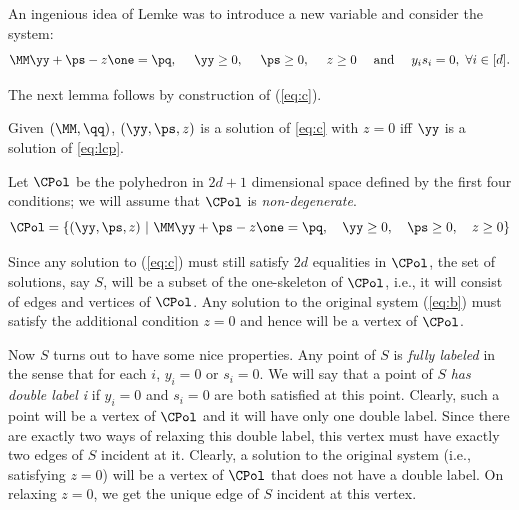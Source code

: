 An ingenious idea of Lemke was to introduce a new variable and consider the system:
\begin{equation} \label{eq:c} \MM \yy  + \ps -z \one  = \pq, \ \ \ \  \yy \geq 0, \ \ \ \ \ps \geq 0, \ \ \ \  z \geq 0  \ \
\ \ \mbox{and} \ \ \ \ y_is_i = 0,\ \forall i\in[d].  \end{equation}

The next lemma follows by construction of (\ref{eq:c}).
\begin{lemma}\label{lem:lemke1}
Given $(\MM,\qq)$, $(\yy,\ps,z)$ is a solution of \eqref{eq:c} with $z=0$ iff $\yy$ is a solution of \eqref{eq:lcp}.
\end{lemma}

Let $\CPol$ be the polyhedron in $2d + 1$ dimensional space defined by the first four conditions; we will assume that
$\CPol$ is {\em non-degenerate}.  
\begin{equation}\label{eq:cp}
\CPol = \{ (\yy,\ps, z) \ |\ \MM \yy  + \ps -z \one  = \pq, \ \ \ \yy \geq 0, \ \ \ \ps \geq 0, \ \ \  z \geq 0\}
\end{equation}

Since any solution to (\ref{eq:c}) must still satisfy $2d$ equalities in $\CPol$, the set of solutions, say
$S$, will be a subset of the one-skeleton of $\CPol$, i.e., it will consist of edges and vertices of $\CPol$.  Any solution to
the original system (\ref{eq:b}) must satisfy the additional condition $z = 0$ and hence will be a vertex of $\CPol$.



Now $S$ turns out to have some nice properties. Any point of $S$ is {\em fully labeled} in the sense that for each $i$, $y_i
= 0$ or $s_i = 0$.  We will say that a point of $S$ {\em has double label i} if $y_i = 0$ and $s_i = 0$ are both satisfied
at this point. Clearly, such a point will be a vertex of $\CPol$ and it will have only one double label.  Since there are
exactly two ways of relaxing this double label, this vertex must have exactly two edges of $S$ incident at it.  Clearly, a
solution to the original system (i.e., satisfying $z = 0$) will be a vertex of $\CPol$ that does not have a double label.  On
relaxing $z=0$, we get the unique edge of $S$ incident at this vertex.

